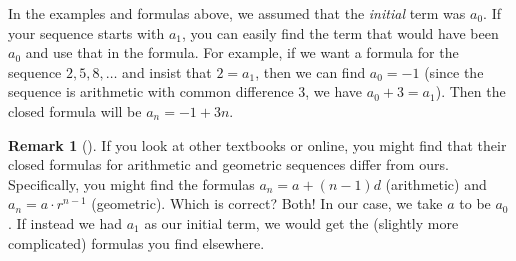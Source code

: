 \documentclass[12pt,]{book}
\theoremstyle{plain}
\theoremstyle{definition}
\newtheorem{remark}[theorem]{Remark}
\theoremstyle{definition}
\theoremstyle{definition}
\numberwithin{equation}{chapter}
\begin{document}
\hypertarget{p-121}{}%
In the examples and formulas above, we assumed that the \emph{initial} term was \(a_0\). If your sequence starts with \(a_1\), you can easily find the term that would have been \(a_0\) and use that in the formula. For example, if we want a formula for the sequence \(2, 5, 8,\ldots\) and insist that \(2= a_1\), then we can find \(a_0 = -1\) (since the sequence is arithmetic with common difference 3, we have \(a_0 + 3 = a_1\)). Then the closed formula will be \(a_n = -1 + 3n\).%
\begin{remark}[]\label{remark-1}
\hypertarget{p-122}{}%
If you look at other textbooks or online, you might find that their closed formulas for arithmetic and geometric sequences differ from ours.  Specifically, you might find the formulas \(a_n = a +(n-1)d\) (arithmetic) and \(a_n = a\cdot r^{n-1}\) (geometric).  Which is correct?  Both!  In our case, we take \(a\) to be \(a_0\).  If instead we had \(a_1\) as our initial term, we would get the (slightly more complicated) formulas you find elsewhere.%
\end{remark}
\typeout{************************************************}
\typeout{************************************************}
\end{document}
